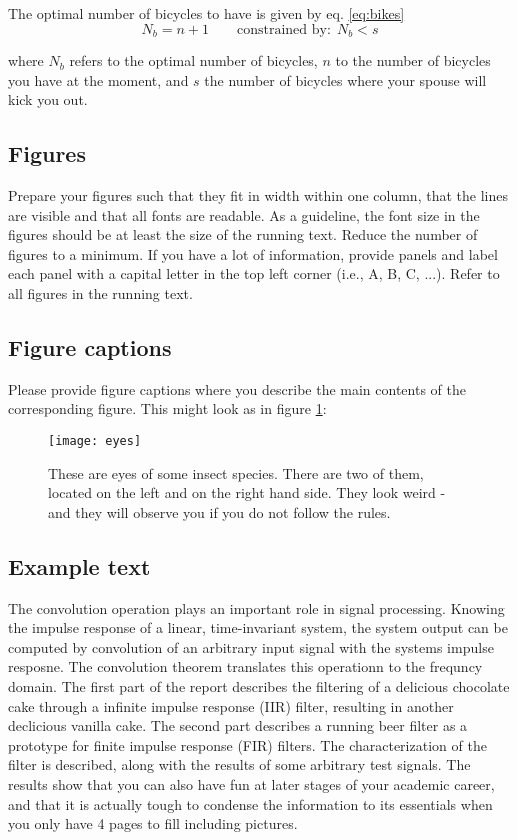 \documentclass[journal]{IEEEtran}
\begin{document}
The optimal number of bicycles to have is given by eq. \ref{eq:bikes}
\begin{equation}\label{eq:bikes}
 N_b = n + 1 \qquad \mbox{constrained by:} \ \ N_b < s
\end{equation}

where $N_b$ refers to the optimal number of bicycles, $n$ to the number of bicycles you have at the moment, and $s$ the number of bicycles where your spouse will kick you out.


\subsection{Figures}
Prepare your figures such that they fit in width within one column, that the lines are visible and that all fonts are readable. As a guideline, the font size in the figures should be at least the size of the running text. Reduce the number of figures to a minimum. If you have a lot of information, provide panels and label each panel with a capital letter in the top left corner (i.e., A, B, C, ...). Refer to all figures in the running text.  

\subsection{Figure captions}
Please provide figure captions where you describe the main contents of the corresponding figure. This might look as in figure \ref{fig:eyes}:
\begin{figure}
 \texttt{[image: eyes]}
 \caption{These are eyes of some insect species. There are two of them, located on the left and on the right hand side. They look weird - and they will observe you if you do not follow the rules.}
 \label{fig:eyes}
\end{figure}

\subsection{Example text} 
The convolution operation plays an important role in signal processing. Knowing the impulse response of a linear, time-invariant system, the system output can be computed by convolution of an arbitrary input signal with the systems impulse resposne. The convolution theorem translates this operationn to the frequncy domain.
The first part of the report describes the filtering of a delicious chocolate cake through a infinite impulse response (IIR) filter, resulting in another declicious vanilla cake. The second part describes a running beer filter as a prototype for finite impulse response (FIR) filters. The characterization of the filter is described, along with the results of some arbitrary test signals.
The results show that you can also have fun at later stages of your academic career, and that it is actually tough to condense the information to its essentials when you only have 4 pages to fill including pictures.
\end{document}
